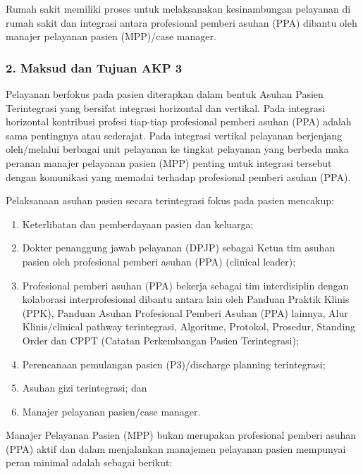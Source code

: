 \documentclass[
]{book}
\begin{document}
Rumah sakit memiliki proses untuk melaksanakan kesinambungan pelayanan di rumah sakit dan integrasi antara profesional pemberi asuhan (PPA) dibantu oleh manajer pelayanan pasien (MPP)/case manager.

\hypertarget{maksud-dan-tujuan-akp-3}{%
\subsubsection*{2. Maksud dan Tujuan AKP 3}\label{maksud-dan-tujuan-akp-3}}

Pelayanan berfokus pada pasien diterapkan dalam bentuk Asuhan Pasien Terintegrasi yang bersifat integrasi horizontal dan vertikal. Pada integrasi horizontal kontribusi profesi tiap-tiap profesional pemberi asuhan (PPA) adalah sama pentingnya atau sederajat. Pada integrasi vertikal pelayanan berjenjang oleh/melalui berbagai unit pelayanan ke tingkat pelayanan yang berbeda maka peranan manajer pelayanan pasien (MPP) penting untuk integrasi tersebut dengan komunikasi yang memadai terhadap profesional pemberi asuhan (PPA).

Pelaksanaan asuhan pasien secara terintegrasi fokus pada pasien mencakup:

\begin{enumerate}
\def\labelenumi{\alph{enumi}.}
\item
  Keterlibatan dan pemberdayaan pasien dan keluarga;
\item
  Dokter penanggung jawab pelayanan (DPJP) sebagai Ketua tim asuhan pasien oleh profesional pemberi asuhan (PPA) (clinical leader);
\item
  Profesional pemberi asuhan (PPA) bekerja sebagai tim interdisiplin dengan kolaborasi interprofesional dibantu antara lain oleh Panduan Praktik Klinis (PPK), Panduan Asuhan Profesional Pemberi Asuhan (PPA) lainnya, Alur Klinis/clinical pathway terintegrasi, Algoritme, Protokol, Prosedur, Standing Order dan CPPT (Catatan Perkembangan Pasien Terintegrasi);
\item
  Perencanaan pemulangan pasien (P3)/discharge planning terintegrasi;
\item
  Asuhan gizi terintegrasi; dan
\item
  Manajer pelayanan pasien/case manager.
\end{enumerate}

Manajer Pelayanan Pasien (MPP) bukan merupakan profesional pemberi asuhan (PPA) aktif dan dalam menjalankan manajemen pelayanan pasien mempunyai peran minimal adalah sebagai berikut:
\end{document}
